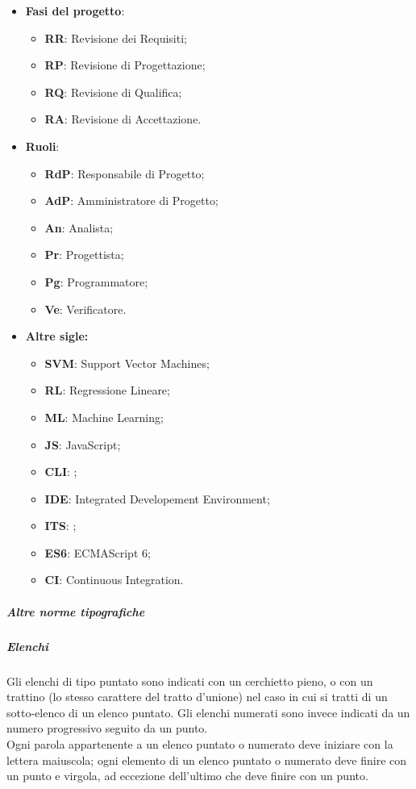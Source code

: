 \documentclass[../norme-di-progetto.tex]{subfiles}
\begin{document}
\begin{itemize}
  \item \textbf{Fasi del progetto}:
  \begin{itemize}
  \item \textbf{RR}: Revisione dei Requisiti;
  \item \textbf{RP}: Revisione di Progettazione;
  \item \textbf{RQ}: Revisione di Qualifica;
  \item \textbf{RA}: Revisione di Accettazione.
  \end{itemize}
  \item \textbf{Ruoli}:
  \begin{itemize}
  \item \textbf{RdP}: Responsabile di Progetto;
  \item \textbf{AdP}: Amministratore di Progetto;
  \item \textbf{An}: Analista;
  \item \textbf{Pr}: Progettista;
  \item \textbf{Pg}: Programmatore;
  \item \textbf{Ve}: Verificatore.
  \end{itemize}
  \item \textbf{Altre sigle:}
  \begin{itemize}
    \item \textbf{SVM}: Support Vector Machines;
    \item \textbf{RL}: Regressione Lineare;
    \item \textbf{ML}: Machine Learning;
    \item \textbf{JS}: JavaScript;
    \item \textbf{CLI}: ;
    \item \textbf{IDE}: Integrated Developement Environment;
    \item \textbf{ITS}: ;
    \item \textbf{ES6}: ECMAScript 6;
    \item \textbf{CI}: Continuous Integration.
  \end{itemize}
\end{itemize}

\subparagraph*{Altre norme tipografiche}
\subparagraph*{Elenchi}
Gli elenchi di tipo puntato sono indicati con un cerchietto pieno, o con un trattino (lo stesso carattere del tratto d'unione) nel caso in cui si tratti di un sotto-elenco di un elenco puntato. Gli elenchi numerati sono invece indicati da un numero progressivo seguito da un punto. \\
Ogni parola appartenente a un elenco puntato o numerato deve iniziare con la lettera maiuscola; ogni elemento di un elenco puntato o numerato deve finire con un punto e virgola, ad eccezione dell'ultimo che deve finire con un punto.
\end{document}

